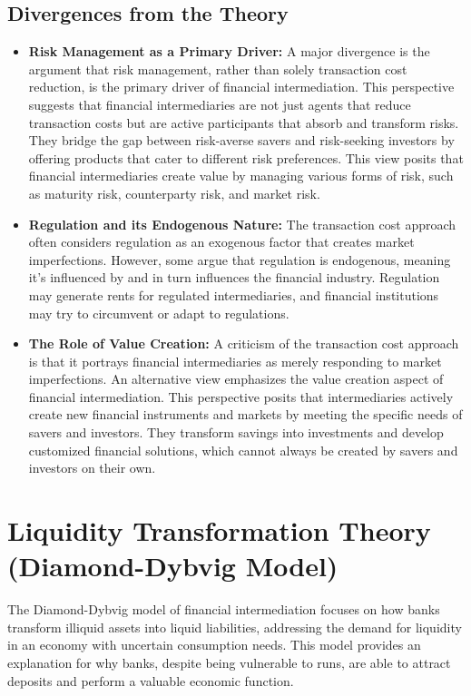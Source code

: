 \subsection*{Divergences from the Theory}
\begin{itemize}
    \item \textbf{Risk Management as a Primary Driver:} A major divergence is the argument that risk management, rather than solely transaction cost reduction, is the primary driver of financial intermediation. This perspective suggests that financial intermediaries are not just agents that reduce transaction costs but are active participants that absorb and transform risks. They bridge the gap between risk-averse savers and risk-seeking investors by offering products that cater to different risk preferences. This view posits that financial intermediaries create value by managing various forms of risk, such as maturity risk, counterparty risk, and market risk.
    \item \textbf{Regulation and its Endogenous Nature:} The transaction cost approach often considers regulation as an exogenous factor that creates market imperfections. However, some argue that regulation is endogenous, meaning it's influenced by and in turn influences the financial industry. Regulation may generate rents for regulated intermediaries, and financial institutions may try to circumvent or adapt to regulations.
    \item \textbf{The Role of Value Creation:} A criticism of the transaction cost approach is that it portrays financial intermediaries as merely responding to market imperfections. An alternative view emphasizes the value creation aspect of financial intermediation. This perspective posits that intermediaries actively create new financial instruments and markets by meeting the specific needs of savers and investors. They transform savings into investments and develop customized financial solutions, which cannot always be created by savers and investors on their own.
\end{itemize}

\section{Liquidity Transformation Theory (Diamond-Dybvig Model)}

The Diamond-Dybvig model of financial intermediation focuses on how banks transform illiquid assets into liquid liabilities, addressing the demand for liquidity in an economy with uncertain consumption needs. This model provides an explanation for why banks, despite being vulnerable to runs, are able to attract deposits and perform a valuable economic function.

